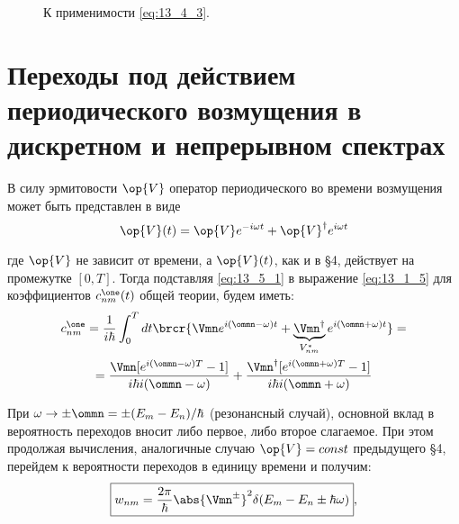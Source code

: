 \begin{figure}[h!]
\centering
{}
\caption{К применимости \eqref{eq:13_4_3}.} \label{fig:13_4}
\end{figure}

\section{Переходы под действием периодического возмущения в дискретном и непрерывном спектрах}

В силу эрмитовости $\op{V}$ оператор периодического во времени возмущения может быть представлен в виде
\begin{equation}
\label{eq:13_5_1}
\op{V}(t) = \op{V}e^{-i\omega t} + \op{V}^\dag e^{i\omega t} 
\end{equation}

где $\op{V}$ не зависит от времени, а $\op{V}(t)$, как и в \S 4, действует на промежутке $[0, T]$. Тогда подставляя \eqref{eq:13_5_1} в выражение \eqref{eq:13_1_5} для коэффициентов $c_{nm}^\one (t)$ общей теории, будем иметь:
\begin{gather*}
c_{nm}^\one = \frac{1}{i \hbar} \int_0^T dt \brcr{\Vmn e^{i(\ommn - \omega)t} + \underbrace{\Vmn^\dag}_{V_{nm}^*} e^{i(\ommn + \omega)t}} = \\
= \frac{\Vmn [e^{i(\ommn - \omega)T} - 1]}{i \hbar i (\ommn - \omega)} + \frac{\Vmn^\dag [e^{i(\ommn + \omega)T} - 1]}{i \hbar i (\ommn + \omega)}
\end{gather*}

При $\omega \to \pm \ommn = \pm (E_m - E_n) / \hbar$ (резонансный случай), основной вклад в вероятность переходов вносит либо первое, либо второе слагаемое. При этом продолжая вычисления, аналогичные случаю $\op{V} = const$ предыдущего \S 4, перейдем к вероятности переходов в единицу времени и получим:
\begin{equation}
\label{eq:13_5_2}
\boxed{w_{nm} = \frac{2\pi}{\hbar} \abs{\Vmn^\pm}^2 \delta(E_m - E_n \pm \hbar \omega)}, 
\end{equation}

